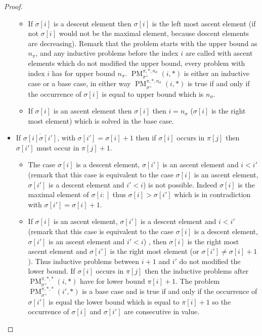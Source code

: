 \documentclass[a4paper]{llncs}
\newcommand{\ptext}{\pi}
\newcommand{\pmotif}{\sigma}
\newcommand{\pbmotif}{\pmotif^+}
\DeclareMathOperator{\PMa}{PM}
\newcommand{\PM}[6]{\PMa_{{#1}}^{{#2},{#3},{#4}}({#5},{#6})}
\begin{document}
\begin{proof}
\begin{itemize}
\begin{itemize}
		\item If $\sigma[i]$ is a descent element then $\sigma[i]$ is the left most ascent element (if not $\sigma[i]$ would not be the maximal element, because descent elements are decreasing). Remark that the problem starts with the upper bound as $n_\ptext$, and any inductive problems before the index $i$ are called with ascent elements which do not modified the upper bound, every problem with index $i$ has for upper bound $n_\ptext$. 		$\PM{\pbmotif}{\ptext}{*}{n_\pmotif}{i}{*}$ is either an inductive case or a base case, in either way  $\PM{\pbmotif}{\ptext}{*}{n_\pmotif}{i}{*}$ is true if and only if the occurrence of $\sigma[i]$ is equal to upper bound which is  $n_\pmotif$.
		
		
		\item If $\sigma[i]$ is an ascent element then $\sigma[i]$ then $i=n_\pmotif$ ($\sigma[i]$ is the right most element) which is solved in the base case.

	\end{itemize}



	\item  If $\overline{\pmotif[i]\pmotif[i']}$, with $\pmotif[i']=\pmotif[i]+1$ then if $\pmotif[i]$ occurs in $\ptext[j]$ then $\pmotif[i']$ must occur in $\ptext[j]+1$.
		\begin{itemize}

			\item The case $\pmotif[i]$ is a descent element, $\pmotif[i']$ is an ascent element and $i<i'$ (remark that this case is equivalent to the case $\pmotif[i]$ is an ascent element, $\pmotif[i']$ is a descent element and $i'<i$) is not possible. 
			Indeed $\pmotif[i]$ is the maximal element of $\pmotif[i:]$ thus $\pmotif[i] > \pmotif[i']$ which is in contradiction with 
			$\pmotif[i']=\pmotif[i]+1$. 
			
			\item If $\pmotif[i]$ is an ascent element, $\pmotif[i']$ is a descent element and $i<i'$ (remark that this case is equivalent to the case $\pmotif[i]$ is a descent element, $\pmotif[i']$ is an ascent element and $i'<i$) , then
			$\pmotif[i]$ is the right most ascent element and $\pmotif[i']$ is the right most element (or $\pmotif[i'] \neq \pmotif[i]+1$). Thus inductive problems between $i+1$ and $i'$ do not modified the lower bound. If $\sigma[i]$ occurs in $\ptext[j]$ then the inductive problems after $\PM{\pbmotif}{\ptext}{*}{*}{i}{*}$ have for lower bound $\ptext[i]+1$. The problem $\PM{\pbmotif}{\ptext}{*}{*}{i'}{*}$ is a base case and is true if and only if
			the occurrence of $\sigma[i']$ is equal the lower bound which is equal to $\ptext[i]+1$ so the occurrence of $\pmotif[i]$ and $\pmotif[i']$ are consecutive in value.
				

\end{itemize}
\end{itemize}
\end{proof}
\end{document}
